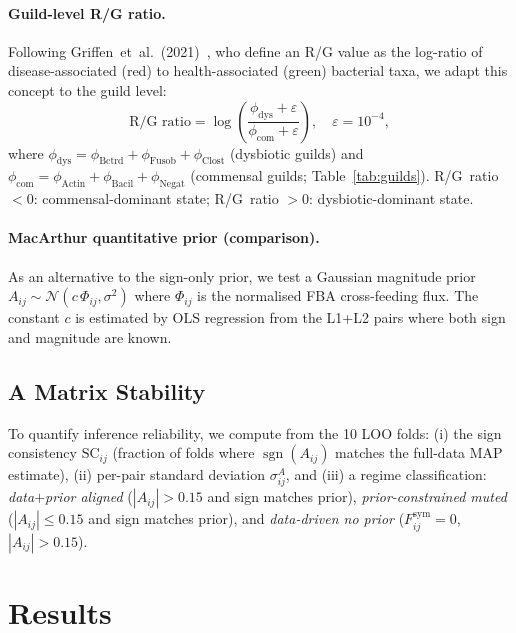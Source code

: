 \documentclass[11pt,a4paper]{article}
\newcommand{\sgn}{\operatorname{sgn}}
\begin{document}
\paragraph{Guild-level R/G ratio.}
Following Griffen~et~al.\ (2021)~\citep{griffen2021}, who define an R/G value
as the log-ratio of disease-associated (red) to health-associated (green)
bacterial taxa, we adapt this concept to the guild level:
\begin{equation}
  \text{R/G ratio} = \log\!\left(\frac{\phi_{\text{dys}} + \varepsilon}
                                       {\phi_{\text{com}} + \varepsilon}\right),
  \quad \varepsilon = 10^{-4},
  \label{eq:rg}
\end{equation}
where $\phi_{\text{dys}} = \phi_{\text{Bctrd}} + \phi_{\text{Fusob}} + \phi_{\text{Clost}}$
(dysbiotic guilds) and
$\phi_{\text{com}} = \phi_{\text{Actin}} + \phi_{\text{Bacil}} + \phi_{\text{Negat}}$
(commensal guilds; Table~\ref{tab:guilds}).
R/G~ratio $<0$: commensal-dominant state;
R/G~ratio $>0$: dysbiotic-dominant state.

\paragraph{MacArthur quantitative prior (comparison).}
As an alternative to the sign-only prior, we test a Gaussian magnitude prior
$A_{ij} \sim \mathcal{N}(c\,\Phi_{ij}, \sigma^2)$ where $\Phi_{ij}$ is the
normalised FBA cross-feeding flux.
The constant $c$ is estimated by OLS regression from the L1+L2 pairs where
both sign and magnitude are known.

\subsection{A Matrix Stability}
\label{ssec:stabilityMethods}

To quantify inference reliability, we compute from the 10 LOO folds:
(i) the sign consistency $\mathrm{SC}_{ij}$ (fraction of folds where
$\sgn(A_{ij})$ matches the full-data MAP estimate),
(ii) per-pair standard deviation $\sigma^{A}_{ij}$, and
(iii) a regime classification:
\textit{data$+$prior aligned} ($|A_{ij}|>0.15$ and sign matches prior),
\textit{prior-constrained muted} ($|A_{ij}|\leq 0.15$ and sign matches prior),
and \textit{data-driven no prior} ($F^\text{sym}_{ij}=0$, $|A_{ij}|>0.15$).

\section{Results}
\label{sec:results}
\end{document}
